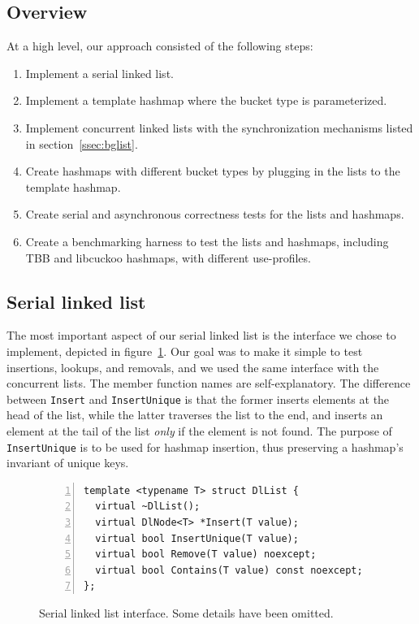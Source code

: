 \documentclass[11pt]{article}
\begin{document}
\subsection{Overview}
At a high level, our approach consisted of the following steps:
\begin{enumerate}
\item
Implement a serial linked list.
\item
Implement a template hashmap where the bucket type is parameterized.
\item
Implement concurrent linked lists with the synchronization mechanisms listed in
section~\ref{ssec:bglist}.
\item
Create hashmaps with different bucket types by plugging in the lists to the
template hashmap.
\item
Create serial and asynchronous correctness tests for the lists and hashmaps.
\item
Create a benchmarking harness to test the lists and hashmaps, including TBB and
libcuckoo hashmaps, with different use-profiles.
\end{enumerate}

\subsection{Serial linked list}
The most important aspect of our serial linked list is the interface we chose to
implement, depicted in figure~\ref{fig:dllist}. Our goal was to make it simple
to test insertions, lookups, and removals, and we used the same interface with
the concurrent lists. The member function names are self-explanatory. The
difference between {\tt Insert} and {\tt InsertUnique} is that the former
inserts elements at the head of the list, while the latter traverses the list to
the end, and inserts an element at the tail of the list {\em only} if the
element is not found. The purpose of {\tt InsertUnique} is to be used for
hashmap insertion, thus preserving a hashmap's invariant of unique keys.

\begin{figure}
\begin{center}
\begin{lstlisting}[numbers=left]
template <typename T> struct DlList {
  virtual ~DlList();
  virtual DlNode<T> *Insert(T value);
  virtual bool InsertUnique(T value);
  virtual bool Remove(T value) noexcept;
  virtual bool Contains(T value) const noexcept;
};
\end{lstlisting}
\caption{Serial linked list interface. Some details have been omitted.}
\label{fig:dllist}
\end{center}
\end{figure}
\end{document}
